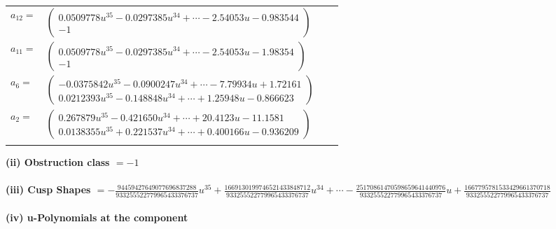 \documentclass[1p]{elsarticle_modified}
\theoremstyle{definition}
\begin{document}
\begin{tabular}{m{7pt} m{180pt} m{7pt} m{180pt} }
\flushright $a_{12}=$&$\begin{pmatrix}0.0509778 u^{35}-0.0297385 u^{34}+\cdots-2.54053 u-0.983544\\-1\end{pmatrix}$ \\
\flushright $a_{11}=$&$\begin{pmatrix}0.0509778 u^{35}-0.0297385 u^{34}+\cdots-2.54053 u-1.98354\\-1\end{pmatrix}$ \\
\flushright $a_{6}=$&$\begin{pmatrix}-0.0375842 u^{35}-0.0900247 u^{34}+\cdots-7.79934 u+1.72161\\0.0212393 u^{35}-0.148848 u^{34}+\cdots+1.25948 u-0.866623\end{pmatrix}$ \\
\flushright $a_{2}=$&$\begin{pmatrix}0.267879 u^{35}-0.421650 u^{34}+\cdots+20.4123 u-11.1581\\0.0138355 u^{35}+0.221537 u^{34}+\cdots+0.400166 u-0.936209\end{pmatrix}$\\&\end{tabular}
\flushleft \textbf{(ii) Obstruction class $= -1$}\\~\\
\flushleft \textbf{(iii) Cusp Shapes $= -\frac{94459427649077696837288}{933255522779965433376737} u^{35}+\frac{1669130199746521433848712}{933255522779965433376737} u^{34}+\cdots-\frac{25170861470598659641440976}{933255522779965433376737} u+\frac{1667795781533429661370718}{933255522779965433376737}$}\\~\\
\newpage\renewcommand{\arraystretch}{1}
\flushleft \textbf{(iv) u-Polynomials at the component}\newline \\
\end{document}
